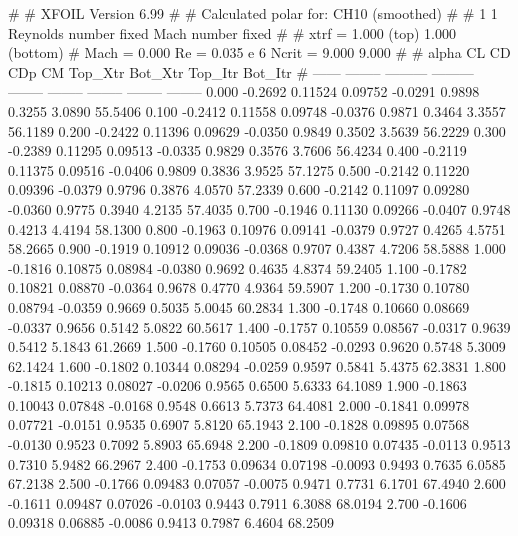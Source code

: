 #  
#       XFOIL         Version 6.99
#  
# Calculated polar for: CH10 (smoothed)                                 
#  
# 1 1 Reynolds number fixed          Mach number fixed         
#  
# xtrf =   1.000 (top)        1.000 (bottom)  
# Mach =   0.000     Re =     0.035 e 6     Ncrit =   9.000  9.000
#  
#   alpha    CL        CD       CDp       CM     Top_Xtr  Bot_Xtr  Top_Itr  Bot_Itr
#  ------ -------- --------- --------- -------- -------- -------- -------- --------
   0.000  -0.2692   0.11524   0.09752  -0.0291   0.9898   0.3255   3.0890  55.5406
   0.100  -0.2412   0.11558   0.09748  -0.0376   0.9871   0.3464   3.3557  56.1189
   0.200  -0.2422   0.11396   0.09629  -0.0350   0.9849   0.3502   3.5639  56.2229
   0.300  -0.2389   0.11295   0.09513  -0.0335   0.9829   0.3576   3.7606  56.4234
   0.400  -0.2119   0.11375   0.09516  -0.0406   0.9809   0.3836   3.9525  57.1275
   0.500  -0.2142   0.11220   0.09396  -0.0379   0.9796   0.3876   4.0570  57.2339
   0.600  -0.2142   0.11097   0.09280  -0.0360   0.9775   0.3940   4.2135  57.4035
   0.700  -0.1946   0.11130   0.09266  -0.0407   0.9748   0.4213   4.4194  58.1300
   0.800  -0.1963   0.10976   0.09141  -0.0379   0.9727   0.4265   4.5751  58.2665
   0.900  -0.1919   0.10912   0.09036  -0.0368   0.9707   0.4387   4.7206  58.5888
   1.000  -0.1816   0.10875   0.08984  -0.0380   0.9692   0.4635   4.8374  59.2405
   1.100  -0.1782   0.10821   0.08870  -0.0364   0.9678   0.4770   4.9364  59.5907
   1.200  -0.1730   0.10780   0.08794  -0.0359   0.9669   0.5035   5.0045  60.2834
   1.300  -0.1748   0.10660   0.08669  -0.0337   0.9656   0.5142   5.0822  60.5617
   1.400  -0.1757   0.10559   0.08567  -0.0317   0.9639   0.5412   5.1843  61.2669
   1.500  -0.1760   0.10505   0.08452  -0.0293   0.9620   0.5748   5.3009  62.1424
   1.600  -0.1802   0.10344   0.08294  -0.0259   0.9597   0.5841   5.4375  62.3831
   1.800  -0.1815   0.10213   0.08027  -0.0206   0.9565   0.6500   5.6333  64.1089
   1.900  -0.1863   0.10043   0.07848  -0.0168   0.9548   0.6613   5.7373  64.4081
   2.000  -0.1841   0.09978   0.07721  -0.0151   0.9535   0.6907   5.8120  65.1943
   2.100  -0.1828   0.09895   0.07568  -0.0130   0.9523   0.7092   5.8903  65.6948
   2.200  -0.1809   0.09810   0.07435  -0.0113   0.9513   0.7310   5.9482  66.2967
   2.400  -0.1753   0.09634   0.07198  -0.0093   0.9493   0.7635   6.0585  67.2138
   2.500  -0.1766   0.09483   0.07057  -0.0075   0.9471   0.7731   6.1701  67.4940
   2.600  -0.1611   0.09487   0.07026  -0.0103   0.9443   0.7911   6.3088  68.0194
   2.700  -0.1606   0.09318   0.06885  -0.0086   0.9413   0.7987   6.4604  68.2509
